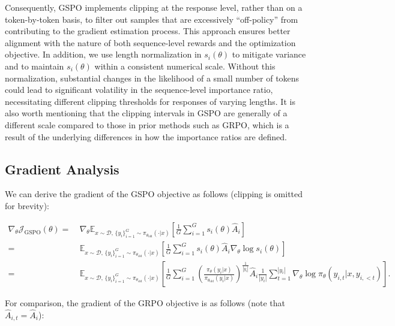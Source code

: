 Consequently, GSPO implements clipping at the response level, rather than on a token-by-token basis, to filter out samples that are excessively ``off-policy'' from contributing to the gradient estimation process. This approach ensures better alignment with the nature of both sequence-level rewards and the optimization objective. In addition, we use length normalization in $s_{i}(\theta)$ to mitigate variance and to maintain $s_{i}(\theta)$ within a consistent numerical scale. Without this normalization, substantial changes in the likelihood of a small number of tokens could lead to significant volatility in the sequence-level importance ratio, necessitating different clipping thresholds for responses of varying lengths. It is also worth mentioning that the clipping intervals in GSPO are generally of a different scale compared to those in prior methods such as GRPO, which is a result of the underlying differences in how the importance ratios are defined.

\subsection{Gradient Analysis}
\label{subsec:gradient}

We can derive the gradient of the GSPO objective as follows (clipping is omitted for brevity):

\begin{align}
\nabla_{\theta} \mathcal{J}_\text{GSPO} (\theta)
=&\ 
\nabla_{\theta} \mathbb{E}_{ x \sim \mathcal{D},\, \{y_i\}_{i=1}^G \sim \pi_{\theta_\text{old}}( \cdot | x) }
\left[ 
\frac{1}{G} \sum_{i=1}^{G} s_{i}(\theta) \widehat{A}_{i}
\right] \\
= &\ 
\mathbb{E}_{ x \sim \mathcal{D},\, \{y_i\}_{i=1}^G \sim \pi_{\theta_\text{old}}( \cdot | x) }
\left[ 
\frac{1}{G} \sum_{i=1}^{G}
s_{i}(\theta) \widehat{A}_{i}
\nabla_{\theta} \log s_{i}(\theta)
\right] \\
=&\ 
\mathbb{E}_{ x \sim \mathcal{D},\, \{y_i\}_{i=1}^G \sim \pi_{\theta_\text{old}}( \cdot | x) }
\left[ 
\frac{1}{G} \sum_{i=1}^{G} 
\left( \frac{ \pi_{\theta} (y_i | x) }{ \pi_{\theta_\text{old}} (y_i | x)} \right)^{\frac{1}{|y_i|}} \widehat{A}_{i} 
\frac{1}{|y_i|} \sum_{t=1}^{|y_i|} \nabla_{\theta} \log \pi_{\theta} (y_{i,t} | x, y_{i,<t}) 
\right].
\label{equ:gspo_grad}
\end{align}

For comparison, the gradient of the GRPO objective is as follows (note that $\widehat{A}_{i,t} = \widehat{A}_{i}$):


